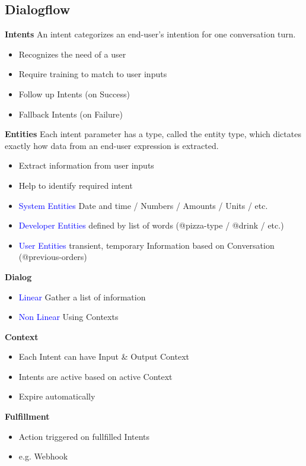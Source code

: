 \subsection{Dialogflow}
\textbf{Intents}
An intent categorizes an end-user's intention for one conversation turn.
\begin{itemize}
    \item Recognizes the need of a user
    \item Require training to match to user inputs
    \item Follow up Intents (on Success)
    \item Fallback Intents (on Failure)
\end{itemize}
\textbf{Entities}
Each intent parameter has a type, called the entity type, which dictates exactly how data from an end-user expression is extracted.
\begin{itemize}
    \item Extract information from user inputs
    \item Help to identify required intent
    \item \textcolor{blue}{System Entities} Date and time / Numbers / Amounts / Units / etc.
    \item \textcolor{blue}{Developer Entities} defined by list of words (@pizza-type / @drink / etc.)
    \item \textcolor{blue}{User Entities} transient, temporary Information based on Conversation (@previous-orders)
\end{itemize}
\textbf{Dialog}
\begin{itemize}
    \item \textcolor{blue}{Linear} Gather a list of information
    \item \textcolor{blue}{Non Linear} Using Contexts
\end{itemize}
\textbf{Context}
\begin{itemize}
    \item Each Intent can have Input \& Output Context
    \item Intents are active based on active Context
    \item Expire automatically
\end{itemize}
\textbf{Fulfillment}
\begin{itemize}
    \item Action triggered on fullfilled Intents
    \item e.g. Webhook
\end{itemize}

